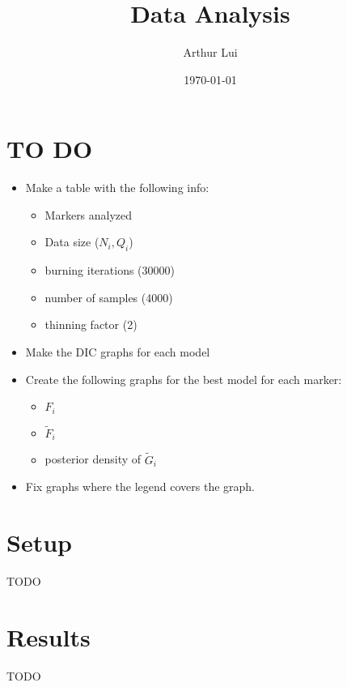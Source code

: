 \documentclass[12pt]{article} %
\title{Data Analysis}
\author{Arthur Lui}
\date{\today} %
\begin{document}
\maketitle

\section{TO DO}
\begin{itemize}
  \item Make a table with the following info:
  \begin{itemize}
    \item Markers analyzed
    \item Data size ($N_i, Q_i$)
    \item burning iterations (30000)
    \item number of samples (4000)
    \item thinning factor (2)
  \end{itemize}
  \item Make the DIC graphs for each model
  \item Create the following graphs for the best model for each marker:
  \begin{itemize}
    \item $F_i$
    \item $\tilde F_i$
    \item posterior density of $\tilde G_i$
  \end{itemize}
  \item Fix graphs where the legend covers the graph. 
\end{itemize}

\section{Setup}\label{sec:data-analysis-setup} %
TODO

\section{Results}\label{sec:data-analysis-results} %
TODO


% 
\end{document}
